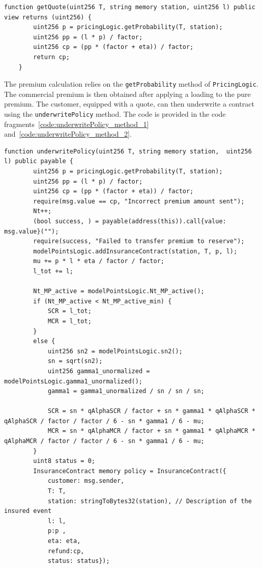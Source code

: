 \documentclass[10pt]{article}
\begin{document}
\begin{codefragment}[!h]
\begin{lstlisting}[language=Solidity]
function getQuote(uint256 T, string memory station, uint256 l) public view returns (uint256) {
        uint256 p = pricingLogic.getProbability(T, station);
        uint256 pp = (l * p) / factor;
        uint256 cp = (pp * (factor + eta)) / factor;
        return cp;
    }
\end{lstlisting}
    \caption{getQuote method of \texttt{InsuranceLogic}}
    \label{code:getQuote_method}
\end{codefragment}

The premium calculation relies on the \texttt{getProbability} method of \texttt{PricingLogic}. The commercial premium is then obtained after applying a loading to the pure premium. The customer, equipped with a quote, can then underwrite a contract using the \texttt{underwritePolicy} method. The code is provided in the code fragments~\ref{code:underwritePolicy_method_1} and~\ref{code:underwritePolicy_method_2}.

\begin{codefragment}[!h]
\begin{lstlisting}[language=Solidity]
function underwritePolicy(uint256 T, string memory station,  uint256 l) public payable {
        uint256 p = pricingLogic.getProbability(T, station);
        uint256 pp = (l * p) / factor;
        uint256 cp = (pp * (factor + eta)) / factor;
        require(msg.value == cp, "Incorrect premium amount sent");
        Nt++;
        (bool success, ) = payable(address(this)).call{value: msg.value}("");
        require(success, "Failed to transfer premium to reserve");
        modelPointsLogic.addInsuranceContract(station, T, p, l);
        mu += p * l * eta / factor / factor;
        l_tot += l;
        
        Nt_MP_active = modelPointsLogic.Nt_MP_active();
        if (Nt_MP_active < Nt_MP_active_min) {
            SCR = l_tot;
            MCR = l_tot;
        }
        else {
            uint256 sn2 = modelPointsLogic.sn2();
            sn = sqrt(sn2);
            uint256 gamma1_unormalized = modelPointsLogic.gamma1_unormalized();
            gamma1 = gamma1_unormalized / sn / sn / sn;
            
            SCR = sn * qAlphaSCR / factor + sn * gamma1 * qAlphaSCR * qAlphaSCR / factor / factor / 6 - sn * gamma1 / 6 - mu;
            MCR = sn * qAlphaMCR / factor + sn * gamma1 * qAlphaMCR * qAlphaMCR / factor / factor / 6 - sn * gamma1 / 6 - mu;
        }
        uint8 status = 0;
        InsuranceContract memory policy = InsuranceContract({
            customer: msg.sender,
            T: T, 
            station: stringToBytes32(station), // Description of the insured event
            l: l,
            p:p ,
            eta: eta,
            refund:cp,
            status: status});
                \end{lstlisting}
    \caption{Part 1 of \texttt{underwritePolicy} method of \texttt{InsuranceLogic}}
    \label{code:underwritePolicy_method_1}
\end{codefragment}
\end{document}
